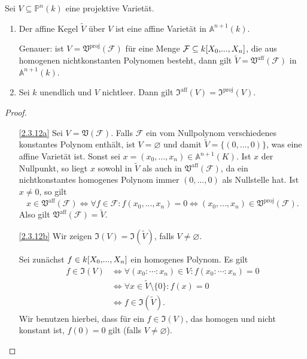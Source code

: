 \documentclass[a4paper,12pt,index=toc]{scrbook}
\theoremstyle{keinenummern} %
\def\A{\mathbb{A}}
\def\V{\mathfrak{V}}
\def\I{\mathfrak{I}}
\def\P{\mathbb{P}}
\newcommand{\F}{\mathcal{F}}
\newcommand{\leer}{\ensuremath{\varnothing}}
\renewcommand{\dotsc}{\ensuremath{\!...}}
\newcommand{\schlange}[1]{\widetilde{#1}}
\newcommand{\ppolyx}[1][n]{\ensuremath%
  [X_{0},\dotsc,X_{#1}]}
\begin{document}
\begin{prop}\label{2.3.12prop}
  Sei $V\subseteq\P^n(k)$ eine projektive Varietät.
  \begin{enumerate}
  \item{} Der affine Kegel $\schlange{V}$ über $V$ ist eine affine Varietät in $\A^{n+1}(k)$. 
  
  Genauer: ist
    $V=\V^{\mathrm{proj}}(\F)$ für eine Menge $\F\subseteq k\ppolyx$, die aus homogenen nichtkonstanten Polynomen besteht, dann
    gilt $\schlange{V}=\V^{\mathrm{aff}}(\F)$ in $\A^{n+1}(k)$.
  \item{} Sei $k$ unendlich und $V$ nichtleer. Dann gilt $\I^{\mathrm{aff}}(V)=\I^{\mathrm{proj}}(V)$.
  \end{enumerate}
\end{prop}
\begin{proof}
  \begin{enumerate}
  \item[\ref{2.3.12a}] Sei $V=\V(\F)$. Falls $\F$ ein vom Nullpolynom verschiedenes konstantes Polynom enthält, ist $V=\leer$
    und damit $\schlange{V}=\{(0,\dotsc,0)\}$, was eine affine Varietät ist. Sonst sei $x=(x_0,\dotsc,x_n)\in\A^{n+1}(K)$. Ist $x$
    der Nullpunkt, so liegt $x$ sowohl in $\schlange{V}$ als auch in $\V^{\mathrm{aff}}(\F)$, da ein nichtkonstantes homogenes
    Polynom immer $(0,\dotsc,0)$ als Nullstelle hat. Ist $x\neq0$, so gilt
    \begin{equation*} x\in\V^{\mathrm{aff}}(\F) \iff \forall f\in\F\colon f(x_0,\dotsc,x_n)=0 \iff
    (x_0,\dotsc,x_n)\in\V^{\mathrm{proj}}(\F). \end{equation*}
    Also gilt $\V^{\mathrm{aff}}(\F)=\schlange{V}$.
  \item[\ref{2.3.12b}] Wir zeigen $\I(V)=\I(\schlange{V})$, falls $V\neq\leer$.

    Sei zunächst $f\in k\ppolyx$ ein homogenes Polynom. Es gilt
    \begin{align*}
      f\in\I(V) &\iff \forall (x_0:\dotsm:x_n)\in V\colon f(x_0:\dotsm:x_n)=0 \\ &\iff \forall x\in\schlange{V}\setminus\{0\}\colon
      f(x)=0 \\ &\iff f\in\I(\schlange{V}).
    \end{align*}
    Wir benutzen hierbei, dass für ein $f\in\I(V)$, das homogen und nicht konstant ist, $f(0)=0$ gilt (falls $V\neq\leer$).


\end{enumerate}
\end{proof}
\end{document}
